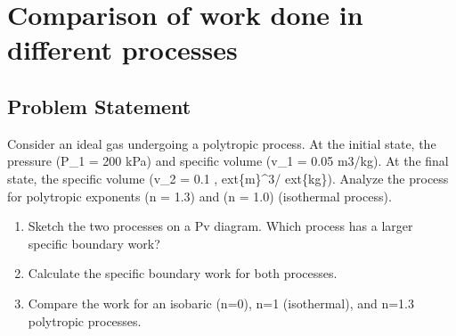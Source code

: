 \documentclass[letterpaper,10pt,english]{jupyterBook}
\begin{document}
\section{Comparison of work done in different processes}
\label{\detokenize{notebooks/Chapter4/Polytropic_Processes_Problem_Extended:comparison-of-work-done-in-different-processes}}\label{\detokenize{notebooks/Chapter4/Polytropic_Processes_Problem_Extended::doc}}

\subsection{Problem Statement}
\label{\detokenize{notebooks/Chapter4/Polytropic_Processes_Problem_Extended:problem-statement}}
\sphinxAtStartPar
Consider an ideal gas undergoing a polytropic process. At the initial state, the pressure (P\_1 = 200 kPa) and specific volume (v\_1 = 0.05	m3/kg). At the final state, the specific volume (v\_2 = 0.1 , 	ext\{m\}\textasciicircum{}3/	ext\{kg\}). Analyze the process for polytropic exponents (n = 1.3) and (n = 1.0) (isothermal process).
\begin{enumerate}
%
\item {} 
\sphinxAtStartPar
Sketch the two processes on a P\sphinxhyphen{}v diagram. Which process has a larger specific boundary work?

\item {} 
\sphinxAtStartPar
Calculate the specific boundary work for both processes.

\item {} 
\sphinxAtStartPar
Compare the work for an isobaric (n=0), n=1 (isothermal), and n=1.3 polytropic processes.

\end{enumerate}
\end{document}
